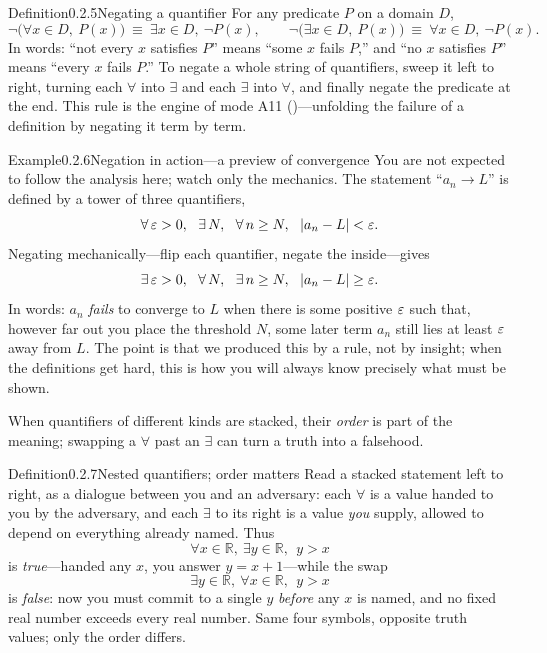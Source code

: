 \documentclass[main.tex]{subfiles}
\begin{document}
\begin{Obj}{Definition}{0.2.5}{Negating a quantifier}
For any predicate $P$ on a domain $D$,
\[
\neg\bigl(\forall x\in D,\ P(x)\bigr)\ \equiv\ \exists x\in D,\ \neg P(x),
\qquad
\neg\bigl(\exists x\in D,\ P(x)\bigr)\ \equiv\ \forall x\in D,\ \neg P(x).
\]
In words: ``not every $x$ satisfies $P$'' means ``some $x$ fails $P$,'' and ``no $x$ satisfies $P$''
means ``every $x$ fails $P$.'' To negate a whole string of quantifiers, sweep it left to right,
turning each $\forall$ into $\exists$ and each $\exists$ into $\forall$, and finally negate the
predicate at the end. This rule is the engine of mode \textsf{A11} ()---unfolding the
failure of a definition by negating it term by term.
\end{Obj}

\begin{ObjL}{Example}{0.2.6}{Negation in action---a preview of convergence}
You are not expected to follow the analysis here; watch only the mechanics. The statement
``$a_n\to L$'' is defined by a tower of three quantifiers,
\[
\forall\,\eps>0,\ \ \exists\,N,\ \ \forall\,n\ge N,\ \ |a_n-L|<\eps.
\]
Negating mechanically---flip each quantifier, negate the inside---gives
\[
\exists\,\eps>0,\ \ \forall\,N,\ \ \exists\,n\ge N,\ \ |a_n-L|\ge\eps.
\]
In words: $a_n$ \emph{fails} to converge to $L$ when there is some positive $\varepsilon$ such that, however
far out you place the threshold $N$, some later term $a_n$ still lies at least $\varepsilon$ away from $L$.
The point is that we produced this by a rule, not by insight; when the definitions get hard, this is
how you will always know precisely what must be shown.
\end{ObjL}

\noindent When quantifiers of different kinds are stacked, their \emph{order} is part of the meaning;
swapping a $\forall$ past an $\exists$ can turn a truth into a falsehood.

\begin{Obj}{Definition}{0.2.7}{Nested quantifiers; order matters}
Read a stacked statement left to right, as a dialogue between you and an adversary: each $\forall$ is
a value handed to you by the adversary, and each $\exists$ to its right is a value \emph{you} supply,
allowed to depend on everything already named. Thus
\[
\forall x\in\mathbb R,\ \exists y\in\mathbb R,\ \ y>x
\]
is \emph{true}---handed any $x$, you answer $y=x+1$---while the swap
\[
\exists y\in\mathbb R,\ \forall x\in\mathbb R,\ \ y>x
\]
is \emph{false}: now you must commit to a single $y$ \emph{before} any $x$ is named, and no fixed real
number exceeds every real number. Same four symbols, opposite truth values; only the order differs.
\end{Obj}
\end{document}
